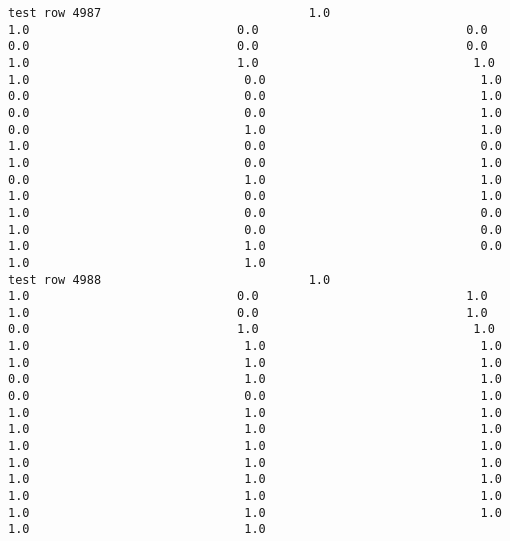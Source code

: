 \documentclass[11pt]{article}
\begin{document}
\begin{verbatim}
test row 4987                             1.0                             1.0                             0.0                             0.0                             0.0                             0.0                             0.0                             1.0                             1.0                              1.0                              1.0                              0.0                              1.0                              0.0                              0.0                              1.0                              0.0                              0.0                              1.0                              0.0                              1.0                              1.0                              1.0                              0.0                              0.0                              1.0                              0.0                              1.0                              0.0                              1.0                              1.0                              1.0                              0.0                              1.0                              1.0                              0.0                              0.0                              1.0                              0.0                              0.0                              1.0                              1.0                              0.0                              1.0                              1.0
test row 4988                             1.0                             1.0                             0.0                             1.0                             1.0                             0.0                             1.0                             0.0                             1.0                              1.0                              1.0                              1.0                              1.0                              1.0                              1.0                              1.0                              0.0                              1.0                              1.0                              0.0                              0.0                              1.0                              1.0                              1.0                              1.0                              1.0                              1.0                              1.0                              1.0                              1.0                              1.0                              1.0                              1.0                              1.0                              1.0                              1.0                              1.0                              1.0                              1.0                              1.0                              1.0                              1.0                              1.0                              1.0                              1.0

\end{verbatim}
\end{document}

